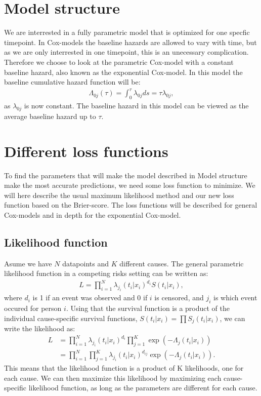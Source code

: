 \documentclass{article}
\begin{document}
\section*{Model structure}
\label{sec:orge2b978e}
We are interrested in a fully parametric model that is optimized for one specfic timepoint. In Cox-models the baseline hazards are allowed to vary with time, but as we are only interrested in one timepoint, this is an unecessary complication. Therefore we choose to look at the parametric Cox-model with a constant baseline hazard, also known as the exponential Cox-model. In this model the baseline cumulative hazard function will be:
\begin{align*}
\Lambda_{0j}(\tau) = \int_0^{\tau} \lambda_{0j}ds = \tau\lambda_{0j},
\end{align*}
as \(\lambda_{0j}\) is now constant. The baseline hazard in this model can be viewed as the average baseline hazard up to \(\tau\).


\section*{Different loss functions}
\label{sec:org790d684}
To find the parameters that will make the model described in Model structure make the most accurate predictions, we need some loss function to minimize. We will here describe the usual maximum likelihood method and our new loss function based on the Brier-score. The loss functions will be described for general Cox-models and in depth for the exponential Cox-model.

\subsection*{Likelihood function}
\label{sec:org8b861bf}
Asume we have \(N\) datapoints and \(K\) different causes. The general parametric likelihood function in a competing risks setting can be written as:
\begin{align*}
L = \prod_{i = 1}^N\lambda_{j_i}(t_i|x_i)^{d_i}S(t_i|x_i),
\end{align*}
where \(d_i\) is 1 if an event was observed and 0 if \(i\) is censored, and \(j_i\) is which event occured for person \(i\). Using that the survival function is a product of the individual cause-specific survival functions, \(S(t_i|x_i) = \prod S_j(t_i|x_i)\), we can write the likelihood as:
\begin{align*}
L &= \prod_{i = 1}^N\lambda_{j_i}(t_i|x_i)^{d_i}\prod_{j = 1}^K\exp(-\Lambda_j(t_i|x_i))\\
&= \prod_{i = 1}^N\prod_{j = 1}^K\lambda_{j_i}(t_i|x_i)^{d_{ij}}\exp(-\Lambda_j(t_i|x_i)).
\end{align*}
This means that the likelihood function is a product of K likelihoods, one for each cause. We can then maximize this likelihood by maximizing each cause-specific likelihood function, as long as the parameters are different for each cause.
\end{document}

